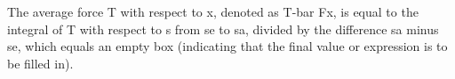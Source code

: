 The average force T with respect to x, denoted as T-bar Fx, is equal to the integral of T with respect to s from se to sa, divided by the difference sa minus se, which equals an empty box (indicating that the final value or expression is to be filled in).